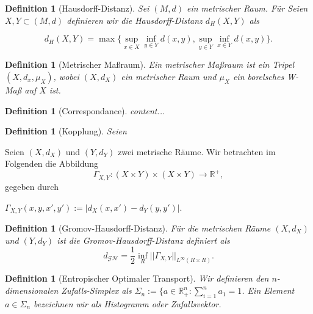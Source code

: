 \documentclass[twoside, 11pt,a4paper]{article}
\def\emph#1{\textit{#1}}
\newtheorem{definition}[theorem]{Definition}
\numberwithin{equation}{section}
\begin{document}
	\begin{definition}[Hausdorff-Distanz]
		Sei $(M,d)$ ein metrischer Raum.
		Für 
		Seien $X,Y \subset (M,d)$ definieren wir die \emph{Hausdorff-Distanz} $d_H(X,Y)$ als
		
		\begin{equation}
		d_H(X,Y) = \max \lbrace \sup_{x \in X} \inf_{y \in Y} d(x,y), \sup_{y \in Y} \inf_{x \in Y} d(x,y) \rbrace .
		\end{equation} 
		
	\end{definition}
	
	\begin{definition}[Metrischer Maßraum]
		Ein \emph{metrischer Maßraum} ist ein Tripel $(X,d_x,\mu_X)$, wobei $(X,d_X)$ ein metrischer Raum und $\mu_X$ ein borelsches W-Maß auf $X$ ist.
	\end{definition}
	
	\begin{definition}[Correspondance]
		content...
	\end{definition}
	
	\begin{definition}[Kopplung]
		Seien 
	\end{definition}
	
	Seien $(X,d_X)$ und $(Y,d_Y)$ zwei metrische Räume. Wir betrachten im Folgenden die Abbildung
	\begin{equation}
	\Gamma_{X,Y}: (X\times Y) \times (X \times Y) \to \mathbb{R^{+}},
	\end{equation}
	gegeben durch
	
	$\Gamma_{X,Y}(x,y,x',y'):= |d_X(x,x') - d_Y(y,y')|$.
	
	\begin{definition}[Gromov-Hausdorff-Distanz]
		Für die metrischen Räume $(X,d_X)$ und $(Y,d_Y)$ ist die \emph{Gromov-Hausdorff-Distanz} definiert als
		\begin{equation}
		d_{\mathcal{G}\mathcal{H}} = \frac{1}{2}\inf_{R}||\Gamma_{X,Y}||_{L^\infty(R \times R)}.
		\end{equation}
	\end{definition}
	\begin{definition}[Entropischer Optimaler Transport]
		Wir definieren den $n$-dimensionalen Zufalls-Simplex als $\Sigma_n := \lbrace a \in \mathbb{R}_+^n: \sum_{i=1}^{n}{a_1} = 1$. Ein Element $a \in \Sigma_n$ bezeichnen wir als Histogramm oder Zufallsvektor.
		
	\end{definition}
	
\end{document}
